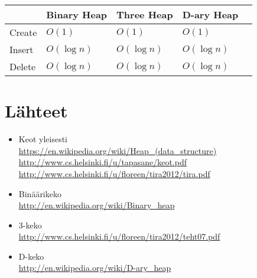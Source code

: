 \documentclass[a4paper,12pt]{article}
\begin{document}
\begin{tabular}{|l|l|l|l|l|}
\hline
&Binary Heap & Three Heap & D-ary Heap \\\hline
Create & $O (1)$ & $O (1)$ & $O (1)$\\\hline
Insert & $O (\log n)$ & $O (\log n)$ & $O (\log n)$\\\hline
Delete  & $O (\log n)$ & $O (\log n)$ & $O (\log n)$\\\hline

\end{tabular}


\section{Lähteet}
\begin{itemize}

\item Keot yleisesti\\
\url{https://en.wikipedia.org/wiki/Heap_(data_structure)}\\
\url{http://www.cs.helsinki.fi/u/tapasane/keot.pdf}\\
\url{http://www.cs.helsinki.fi/u/floreen/tira2012/tira.pdf}

\item Binäärikeko\\
\url{http://en.wikipedia.org/wiki/Binary_heap}

\item 3-keko\\
\url{http://www.cs.helsinki.fi/u/floreen/tira2012/teht07.pdf}

\item D-keko\\
\url{http://en.wikipedia.org/wiki/D-ary_heap}
\end{itemize}
\end{document}
